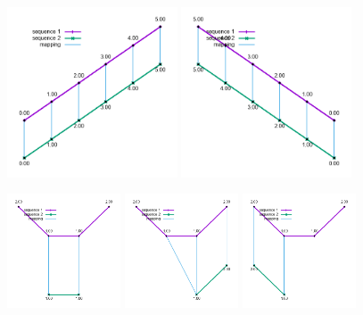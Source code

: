\documentclass[12pt]{article}
\begin{document}
\begin{figure}[h]
    \centering
    \includegraphics[width=0.45\textwidth, height=0.45\textwidth]{tests/incr}
    \includegraphics[width=0.45\textwidth, height=0.45\textwidth]{tests/decr}
\end{figure}

\newpage

\begin{figure}[h]
    \centering
    \includegraphics[width=0.3\textwidth, height=0.3\textwidth]{tests/misc1}
    \includegraphics[width=0.3\textwidth, height=0.3\textwidth]{tests/misc2}
    \includegraphics[width=0.3\textwidth, height=0.3\textwidth]{tests/misc3}
\end{figure}
\end{document}
